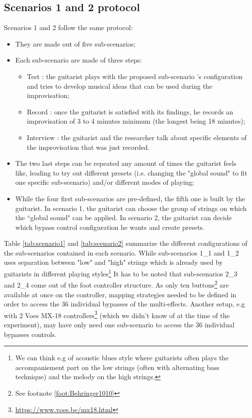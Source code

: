 \documentclass{article}
\begin{document}
\subsection{Scenarios 1 and 2 protocol}
Scenarios 1 and 2 follow the same protocol: 
\begin{itemize}
    \item They are made out of five sub-scenarios;
    \item Each sub-scenario are made of three steps: 
    \begin{itemize}
        \item Test : the guitarist plays with the proposed sub-scenario 's configuration and tries to develop musical ideas that can be used during the improvisation;
        \item Record : once the guitarist is satisfied with its findings, he records an improvisation of 3 to 4 minutes minimum (the longest being 18 minutes);
        \item Interview : the guitarist and the researcher talk about specific elements of the improvisation that was just recorded.
    \end{itemize}
    \item The two last steps can be repeated any amount of times the guitarist feels like, leading to try out different presets (i.e. changing the "global sound" to fit one specific sub-scenario) and/or different modes of playing;
    \item While the four first sub-scenarios are pre-defined, the fifth one is built by the guitarist. In scenario 1, the guitarist can choose the group of strings on which the ``global sound" can be applied. In scenario 2, the guitarist can decide which bypass control configuration he wants and create presets.
\end{itemize}

Table \ref{tab:scenario1} and \ref{tab:scenario2} summarize the different configurations of the sub-scenarios contained in each scenario.
While sub-scenarios 1\_1 and 1\_2 uses separation between "low" and "high" strings which is already used by guitarists in different playing styles\footnote{We can think e.g of acoustic blues style where guitarists often plays the accompaniement part on the low strings (often with alternating bass technique) and the melody on the high strings.}
It has to be noted that sub-scenarios 2\_3 and 2\_4 come out of the foot controller structure. As only ten buttons\footnote{See footnote \ref{foot:Behringer1010}} are available at once on the controller, mapping strategies needed to be defined in order to access the 36 individual bypasses of the multi-effects.  Another setup, e.g with 2 Voes MX-18 controllers\footnote{\href{https://www.voes.be/mx18.html}{https://www.voes.be/mx18.html}} (which we didn't know of at the time of the experiment), may have only need one sub-scenario to access the 36 individual bypasses controls.
\end{document}

